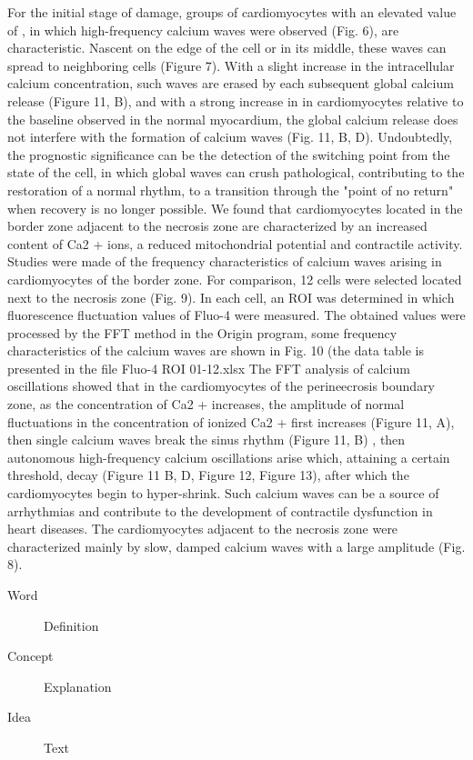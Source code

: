\documentclass{biophys-new}
\begin{document}
For the initial stage of damage, groups of cardiomyocytes with an elevated value of , in which high-frequency calcium waves were observed (Fig. 6), are characteristic. Nascent on the edge of the cell or in its middle, these waves can spread to neighboring cells (Figure 7). With a slight increase in the intracellular calcium concentration, such waves are erased by each subsequent global calcium release (Figure 11, B), and with a strong increase in  in cardiomyocytes relative to the baseline observed in the normal myocardium, the global calcium release does not interfere with the formation of calcium waves (Fig. 11, B, D). Undoubtedly, the prognostic significance can be the detection of the switching point from the state of the cell, in which global waves can crush pathological, contributing to the restoration of a normal rhythm, to a transition through the "point of no return" when recovery is no longer possible.
We found that cardiomyocytes located in the border zone adjacent to the necrosis zone are characterized by an increased content of Ca2 + ions, a reduced mitochondrial potential and contractile activity. Studies were made of the frequency characteristics of calcium waves arising in cardiomyocytes of the border zone. For comparison, 12 cells were selected located next to the necrosis zone (Fig. 9). In each cell, an ROI was determined in which fluorescence fluctuation values of Fluo-4 were measured. The obtained values were processed by the FFT method in the Origin program, some frequency characteristics of the calcium waves are shown in Fig. 10 (the data table is presented in the file Fluo-4 ROI 01-12.xlsx
The FFT analysis of calcium oscillations showed that in the cardiomyocytes of the perineecrosis boundary zone, as the concentration of Ca2 + increases, the amplitude of normal fluctuations in the concentration of ionized Ca2 + first increases (Figure 11, A), then single calcium waves break the sinus rhythm (Figure 11, B) ,
then autonomous high-frequency calcium oscillations arise which, attaining a certain threshold, decay (Figure 11 B, D, Figure 12, Figure 13), after which the cardiomyocytes begin to hyper-shrink. Such calcium waves can be a source of arrhythmias and contribute to the development of contractile dysfunction in heart diseases.
The cardiomyocytes adjacent to the necrosis zone were characterized mainly by slow, damped calcium waves with a large amplitude (Fig. 8).

\begin{description}
\item[Word] Definition
\item[Concept] Explanation
\item[Idea] Text
\end{description}
\end{document}
